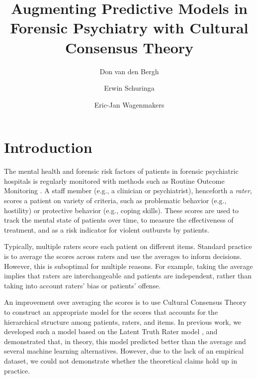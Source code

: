 \documentclass[a4paper,11pt]{article}
\title{Augmenting Predictive Models in Forensic Psychiatry with Cultural Consensus Theory}
\author[1]{Don van den Bergh}
\author[2]{Erwin Schuringa}
\author[1]{Eric-Jan Wagenmakers}
\affil[1]{Department of Psychological Methods, University of Amsterdam}
\affil[2]{Forensic Psychiatric Center Dr. S. van Mesdag}
\date{}
\begin{document}
\maketitle

\tableofcontents

\begin{abstract}

\end{abstract}

\section{Introduction} %

The mental health and forensic risk factors of patients in forensic psychiatric hospitals is regularly monitored with methods such as
Routine Outcome Monitoring \parencite{deBeurs2011ROM}.
A staff member (e.g., a clinician or psychiatrist), henceforth a \emph{rater}, scores a patient on variety of criteria, such as problematic behavior (e.g., hostility) or protective behavior (e.g., coping skills).
These scores are used to track the mental state of patients over time, to measure the effectiveness of treatment, and as a risk indicator for violent outbursts by patients.

Typically, multiple raters score each patient on different items.
Standard practice is to average the scores across raters and use the averages to inform decisions.
However, this is suboptimal for multiple reasons. %
For example, taking the average implies that raters are interchangeable and patients are independent, rather than taking into account raters' bias or patients' offense.


An improvement over averaging the scores is to use Cultural Consensus Theory \parencite[CCT;][]{romney1986culture, batchelder1988test, batchelder2012cultural} to construct an appropriate model for the scores that accounts for the hierarchical structure among patients, raters, and items.
In previous work, we developed such a model based on the Latent Truth Rater model \parencite[LTM; ][]{Anders2015cultural}, and demonstrated that, in theory, this model predicted better than the average and several machine learning alternatives.
However, due to the lack of an empirical dataset, we could not demonstrate whether the theoretical claims hold up in practice.
\end{document}
